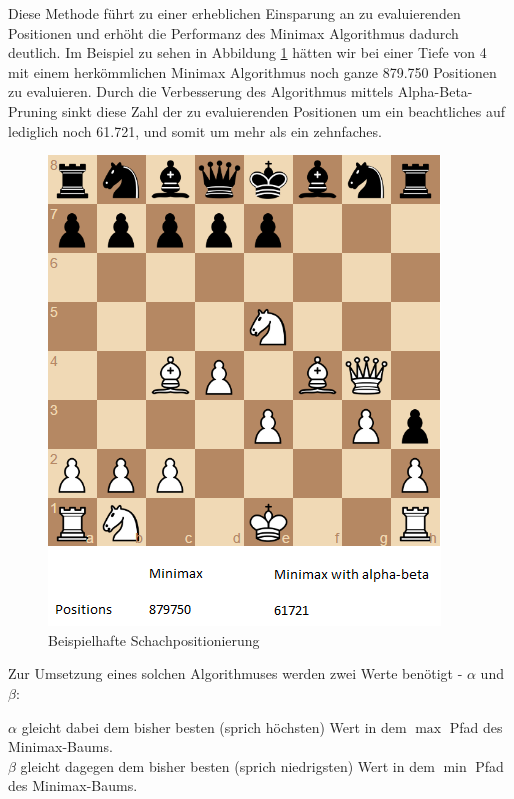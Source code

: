 Diese Methode führt zu einer erheblichen Einsparung an zu evaluierenden Positionen und erhöht die Performanz des Minimax Algorithmus dadurch deutlich. Im Beispiel zu sehen in Abbildung \ref{fig:chess_example} hätten wir bei einer Tiefe von 4 mit einem herkömmlichen Minimax Algorithmus noch ganze 879.750 Positionen zu evaluieren. Durch die Verbesserung des Algorithmus mittels Alpha-Beta-Pruning sinkt diese Zahl der zu evaluierenden Positionen um ein beachtliches auf lediglich noch 61.721, und somit um mehr als ein zehnfaches. \cite{Hartikka}

\begin{figure}[h]
\centering
\includegraphics[width=\textwidth/2]{images/alpha-beta-example.png}

\caption{Beispielhafte Schachpositionierung \cite{Hartikka}}\label{fig:chess_example}
\end{figure}

Zur Umsetzung eines solchen Algorithmuses werden zwei Werte benötigt - $\alpha$ und $\beta$:

$\alpha$ gleicht dabei dem bisher besten (sprich höchsten) Wert in dem $\max$ Pfad des Minimax-Baums.\\
$\beta$ gleicht dagegen dem bisher besten (sprich niedrigsten) Wert in dem $\min$ Pfad des Minimax-Baums. \cite{Russell2010}

